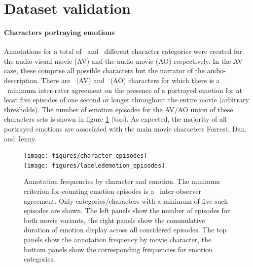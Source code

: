 \section*{Dataset validation}


\paragraph{Characters portraying emotions} Annotations for a total of
\AVTotalCharLabels\ and \AOTotalCharLabels\ different character categories were
created for the audio-visual movie (AV) and the audio movie (AO) respectively.
In the AV case, these comprise all possible characters but the narrator of the
audio-description.  There are \AVThreshCharLabels~(AV) and
\AOThreshCharLabels~(AO) characters for which there is a \AVAggThresh\ minimum
inter-rater agreement on the presence of a portrayed emotion for at least five
episodes of one second or longer throughout the entire movie (arbitrary
thresholds). The number of emotion episodes for the AV/AO union of these
characters sets is shown in figure \ref{fig:threshcharemo} (top).  As expected,
the majority of all portrayed emotions are associated with the main movie
characters Forrest, Dan, and Jenny.

\begin{figure}
  \centering
  \texttt{[image: figures/character\_episodes]}\\
  \texttt{[image: figures/labeledemotion\_episodes]}
  \caption{Annotation frequencies by character and emotion. The minimum
    criterion for counting emotion episodes is a \AVAggThresh\ inter-observer agreement.
    Only categories/characters with a minimum of five such episodes are shown.
    The left panels show the number of episodes for both movie variants, the
    right panels show the commulative duration of emotion display across all
    considered episodes. The top panels show the annotation frequency by movie
    character, the bottom panels show the corresponding frequencies for emotion
  categories.}
  \label{fig:threshcharemo}
\end{figure}

